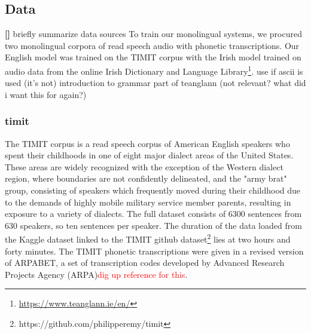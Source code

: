 \documentclass[thesis]{cluu}
\newcounter{paranum}
\newcommand{\numberedparagraph}{\par\refstepcounter{paranum}\textbf{[\theparanum] }}
\newcommand{\todo}[1]{\textcolor{red}{#1}}
\begin{document}
\subsection{Data}
\numberedparagraph{briefly summarize data sources}
To train our monolingual systems, we procured two monolingual corpora of read speech audio with phonetic transcriptions. Our English model was trained on the TIMIT corpus \textcite{garofolo1993timit} with the Irish model trained on audio data from the online Irish Dictionary and Language Library\footnote{\url{https://www.teanglann.ie/en/}}. 
\textcite{krishenbaumRepresentingIPAPhonetics} use if ascii is used (it's not)
\textcite{mechuraIntroductionGramadanIrish} introduction to grammar part of teanglann (not relevant? what did i want this for again?)

\subsubsection{timit}
The TIMIT corpus is a read speech corpus of American English speakers who spent their childhoods in one of eight major dialect areas of the United States. These areas are widely recognized with the exception of the Western dialect region, where boundaries are not confidently delineated, and the "army brat" group, consisting of speakers which frequently moved during their childhood due to the demands of highly mobile military service member parents, resulting in exposure to a variety of dialects\parencite{garofoloDARPATIMITAcousticphonetic1993}. The full dataset consists of 6300 sentences from 630 speakers, so ten sentences per speaker. The duration of the data loaded from the Kaggle dataset linked to the TIMIT github dataset\footnote{https://github.com/philipperemy/timit} lies at two hours and forty minutes. The TIMIT phonetic transcriptions were given in a revised version of ARPABET, a set of transcription codes developed by Advanced Research Projects Agency (ARPA)\todo{dig up reference for this}. 
\end{document}

